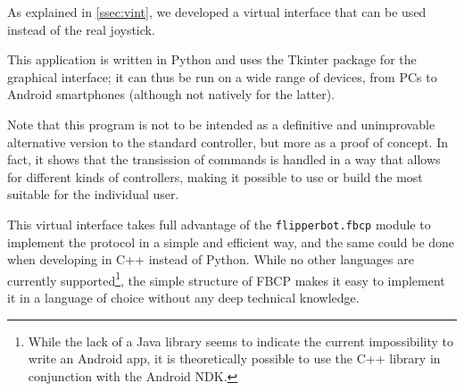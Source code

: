 As explained in \autoref{ssec:vint}, we developed a virtual interface that can
be used instead of the real joystick.

This application is written in Python and uses the Tkinter package for the
graphical interface; it can thus be run on a wide range of devices, from PCs
to Android smartphones (although not natively for the latter).

Note that this program is not to be intended as a definitive and unimprovable
alternative version to the standard controller, but more as a proof of concept.
In fact, it shows that the transission of commands is handled in a way that allows for
different kinds of controllers, making it possible to use or build the most
suitable for the individual user.

This virtual interface takes full advantage of the \Verb|flipperbot.fbcp|
module to implement the protocol in a simple and efficient way, and the same
could be done when developing in C++ instead of Python. While no other languages
are currently supported\footnote{While the lack of a Java library seems to
indicate the current impossibility to write an Android app, it is theoretically
possible to use the C++ library in conjunction with the Android NDK.}, the simple structure of FBCP makes it easy
to implement it in a language of choice without any deep technical knowledge.
